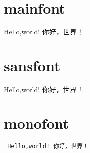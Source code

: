 \documentclass{ctexart}
\begin{document}
\section{mainfont}

Hello,world!
你好，世界！


\section{sansfont}

{\sf 
Hello,world!
你好，世界！
}

\section{monofont}

{\tt
Hello,world!
你好，世界！
}
\end{document}
